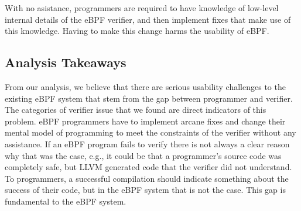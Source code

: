 With no asistance, programmers are required to have knowledge of low-level
    internal details of the eBPF verifier, and then implement fixes that
    make use of this knowledge.
Having to make this change harms the usability of eBPF.


\subsection{Analysis Takeaways}
From our analysis, we believe that there are serious usability challenges to the
    existing eBPF system that stem from the gap between programmer and verifier.
The categories of verifier issue that we found are direct indicators of this problem.
eBPF programmers have to implement arcane fixes and change their mental model of
    programming to meet the constraints of the verifier without any assistance.
If an eBPF program fails to verify there is not always a clear reason why that was the case, e.g.,
it could be that a programmer's source code was completely safe, but LLVM generated code that the verifier did not understand.
To programmers, a successful compilation should indicate something about the success of their code, but in the eBPF system that is not the case.
This gap is fundamental to the eBPF system.



